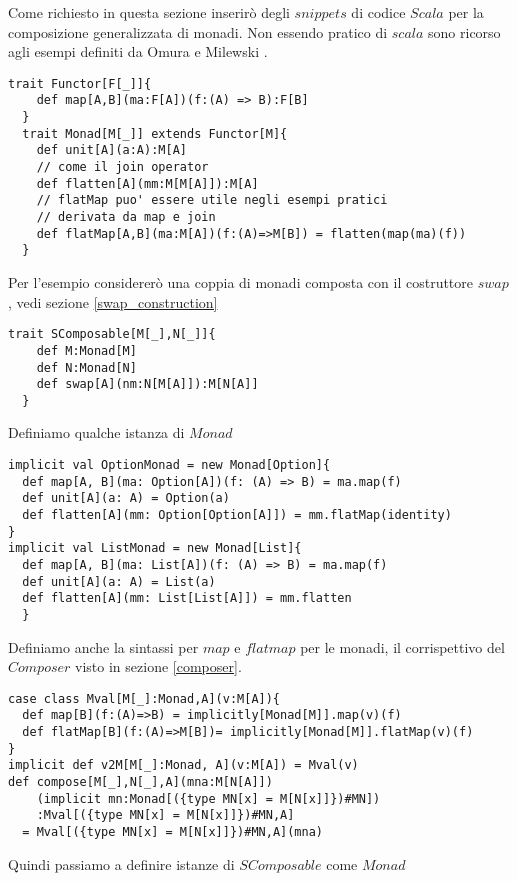 \label{scala_code}
Come richiesto in questa sezione inserirò degli $snippets$ di codice $Scala$
per la composizione generalizzata di monadi.
Non essendo pratico di $scala$ sono ricorso agli esempi definiti da Omura \cite{omura0}
e Milewski \cite{milewski0}.

\begin{lstlisting}[style=myScalastyle, caption=Functor and Monad Traits]
  trait Functor[F[_]]{
    def map[A,B](ma:F[A])(f:(A) => B):F[B]
  }
  trait Monad[M[_]] extends Functor[M]{
    def unit[A](a:A):M[A]
    // come il join operator
    def flatten[A](mm:M[M[A]]):M[A]
    // flatMap puo' essere utile negli esempi pratici
    // derivata da map e join
    def flatMap[A,B](ma:M[A])(f:(A)=>M[B]) = flatten(map(ma)(f))
  }
\end{lstlisting}

Per l'esempio considererò una coppia di monadi composta con il costruttore $swap$,
vedi sezione \ref{swap_construction}

\begin{lstlisting}[style=myScalastyle, caption=Swap Constructor]
  trait SComposable[M[_],N[_]]{
    def M:Monad[M]
    def N:Monad[N]
    def swap[A](nm:N[M[A]]):M[N[A]]
  }
\end{lstlisting}

Definiamo qualche istanza di $Monad$

\begin{lstlisting}[style=myScalastyle, caption=Type class instances]
implicit val OptionMonad = new Monad[Option]{
  def map[A, B](ma: Option[A])(f: (A) => B) = ma.map(f)
  def unit[A](a: A) = Option(a)
  def flatten[A](mm: Option[Option[A]]) = mm.flatMap(identity)
}
implicit val ListMonad = new Monad[List]{
  def map[A, B](ma: List[A])(f: (A) => B) = ma.map(f)
  def unit[A](a: A) = List(a)
  def flatten[A](mm: List[List[A]]) = mm.flatten
  }
\end{lstlisting}
\pagebreak
Definiamo anche la sintassi per $map$ e $flatmap$ per le monadi, il corrispettivo
del $Composer$ visto in sezione \ref{composer}.
\begin{lstlisting}[style=myScalastyle, caption=Type class instances]
case class Mval[M[_]:Monad,A](v:M[A]){
  def map[B](f:(A)=>B) = implicitly[Monad[M]].map(v)(f)
  def flatMap[B](f:(A)=>M[B])= implicitly[Monad[M]].flatMap(v)(f)
}
implicit def v2M[M[_]:Monad, A](v:M[A]) = Mval(v)
def compose[M[_],N[_],A](mna:M[N[A]])
    (implicit mn:Monad[({type MN[x] = M[N[x]]})#MN])
    :Mval[({type MN[x] = M[N[x]]})#MN,A]
  = Mval[({type MN[x] = M[N[x]]})#MN,A](mna)
\end{lstlisting}
Quindi passiamo a definire istanze di $SComposable$ come $Monad$

